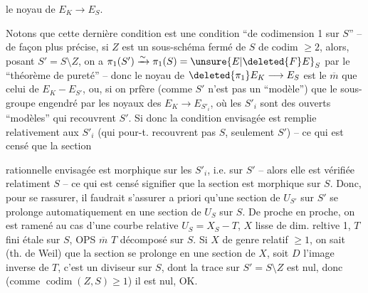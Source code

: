 le noyau de $E_K\longrightarrow E_S$.

Notons que cette dernière condition est une condition ``de codimension 1 sur $S$'' -- de façon plus précise, si $Z$ est un sous-schéma fermé de $S$ de codim $\geq 2$,  alors, posant $S'=S\setminus Z$, on a $\pi_1(S')\xrightarrow{\sim}\pi_1(S)=\unsure{E|\deleted{F}E}_S$ par le ``théorème de pureté'' -- donc le noyau de $\deleted{\pi_1}E_K\longrightarrow E_S$ est le $\overline{m}$ que celui de $E_K-E_{S'}$, ou, si on prfère (comme $S'$ n'est pas un ``modèle'') que le sous-groupe  engendré par les noyaux des $E_K\longrightarrow E_{S'_i}$, où les $S'_i$ sont des ouverts ``modèles'' qui recouvrent $S'$. Si donc la condition envisagée est remplie relativement aux $S'_i$ (qui pour-t.   recouvrent pas $S$, seulement $S'$) -- ce qui est censé  que la section

rationnelle envisagée est morphique sur
les $S'_i$, i.e. sur $S'$ -- alors elle est
vérifiée relatiment  $S$ -- ce qui
est censé signifier que la section est
morphique sur $S$. Donc, pour se
rassurer, il faudrait s'assurer a
priori qu'une section de $U_{S'}$ sur $S'$
se prolonge automatiquement en 
une section de $U_S$ sur $S$. De proche
en proche, on est ramené au cas
d'une courbe relative $U_S=X_S-T$,
$X$ lisse  de dim. reltive 1, $T$ fini étale
sur $S$,  OPS $\overline m$ $T$ décomposé sur $S$.
Si $X$ de genre relatif $\geq 1$, on sait
(th. de Weil) que la section se prolonge
en une section de $X$, soit $D$ l'image
inverse de $T$, c'est un diviseur sur $S$,
dont la trace sur $S'=S\setminus Z$ est nul, donc
(comme $\operatorname{codim}(Z,S)\geq 1$) il est nul, OK.

